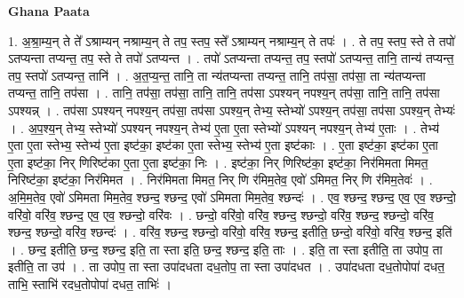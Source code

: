 \documentclass[17pt]{extarticle}
\begin{document}
\textbf{Ghana Paata } \newline

1. अ॒श्रा॒म्य॒न् ते ते᳚ ऽश्राम्यन् नश्राम्य॒न् ते तप॒ स्तप॒ स्ते᳚ ऽश्राम्यन् नश्राम्य॒न् ते तपः॑ । . ते तप॒ स्तप॒ स्ते ते तपो॑ ऽतप्यन्ता तप्यन्त॒ तप॒ स्ते ते तपो॑ ऽतप्यन्त । . तपो॑ ऽतप्यन्ता तप्यन्त॒ तप॒ स्तपो॑ ऽतप्यन्त॒ तानि॒ तान्य॑ तप्यन्त॒ तप॒ स्तपो॑ ऽतप्यन्त॒ तानि॑ । . अ॒त॒प्य॒न्त॒ तानि॒ ता न्य॑तप्यन्ता तप्यन्त॒ तानि॒ तप॑सा॒ तप॑सा॒ ता न्य॑तप्यन्ता तप्यन्त॒ तानि॒ तप॑सा । . तानि॒ तप॑सा॒ तप॑सा॒ तानि॒ तानि॒ तप॑सा ऽपश्यन् नपश्य॒न् तप॑सा॒ तानि॒ तानि॒ तप॑सा ऽपश्यन्न् । . तप॑सा ऽपश्यन् नपश्य॒न् तप॑सा॒ तप॑सा ऽपश्य॒न् तेभ्य॒ स्तेभ्यो॑ ऽपश्य॒न् तप॑सा॒ तप॑सा ऽपश्य॒न् तेभ्यः॑ । . अ॒प॒श्य॒न् तेभ्य॒ स्तेभ्यो॑ ऽपश्यन् नपश्य॒न् तेभ्य॑ ए॒ता ए॒ता स्तेभ्यो॑ ऽपश्यन् नपश्य॒न् तेभ्य॑ ए॒ताः । . तेभ्य॑ ए॒ता ए॒ता स्तेभ्य॒ स्तेभ्य॑ ए॒ता इष्ट॑का॒ इष्ट॑का ए॒ता स्तेभ्य॒ स्तेभ्य॑ ए॒ता इष्ट॑काः । . ए॒ता इष्ट॑का॒ इष्ट॑का ए॒ता ए॒ता इष्ट॑का॒ निर् णिरिष्ट॑का ए॒ता ए॒ता इष्ट॑का॒ निः । . इष्ट॑का॒ निर् णिरिष्ट॑का॒ इष्ट॑का॒ निर॑मिमता मिमत॒ निरिष्ट॑का॒ इष्ट॑का॒ निर॑मिमत । . निर॑मिमता मिमत॒ निर् णि र॑मिम॒तेव॒ एवो॑ ऽमिमत॒ निर् णि र॑मिम॒तेवः॑ । . अ॒मि॒म॒तेव॒ एवो॑ ऽमिमता मिम॒तेव॒ श्छन्द॒ श्छन्द॒ एवो॑ ऽमिमता मिम॒तेव॒ श्छन्दः॑ । . एव॒ श्छन्द॒ श्छन्द॒ एव॒ एव॒ श्छन्दो॒ वरि॑वो॒ वरि॑व॒ श्छन्द॒ एव॒ एव॒ श्छन्दो॒ वरि॑वः । . छन्दो॒ वरि॑वो॒ वरि॑व॒ श्छन्द॒ श्छन्दो॒ वरि॑व॒ श्छन्द॒ श्छन्दो॒ वरि॑व॒ श्छन्द॒ श्छन्दो॒ वरि॑व॒ श्छन्दः॑ । . वरि॑व॒ श्छन्द॒ श्छन्दो॒ वरि॑वो॒ वरि॑व॒ श्छन्द॒ इतीति॒ छन्दो॒ वरि॑वो॒ वरि॑व॒ श्छन्द॒ इति॑ । . छन्द॒ इतीति॒ छन्द॒ श्छन्द॒ इति॒ ता स्ता इति॒ छन्द॒ श्छन्द॒ इति॒ ताः । . इति॒ ता स्ता इतीति॒ ता उपोप॒ ता इतीति॒ ता उप॑ । . ता उपोप॒ ता स्ता उपा॑दधता दध॒तोप॒ ता स्ता उपा॑दधत । . उपा॑दधता दध॒तोपोपा॑ दधत॒ ताभि॒ स्ताभि॑ रदध॒तोपोपा॑ दधत॒ ताभिः॑ । \newline
\end{document}
